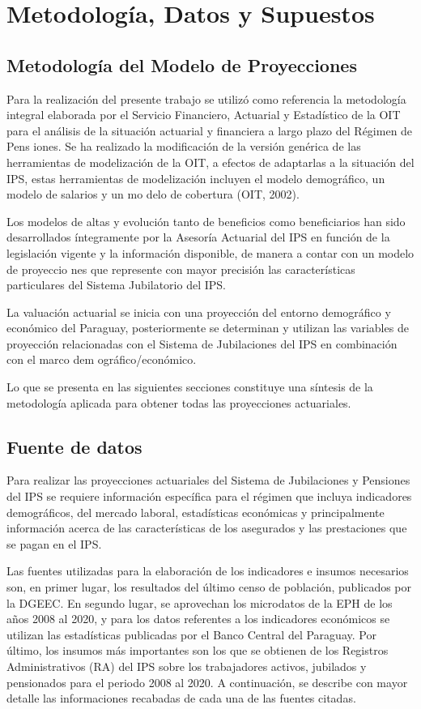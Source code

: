 \section{Metodología, Datos y Supuestos }\subsection{Metodología del Modelo de Proyecciones}

Para la realización del presente trabajo se utilizó como referencia la
metodología integral elaborada por el Servicio Financiero, Actuarial y
Estadístico de la OIT para el análisis de la situación actuarial y
financiera a largo plazo del Régimen de Pens iones. Se ha realizado la
modificación de la versión genérica de las herramientas de modelización
de la OIT, a efectos de adaptarlas a la situación del IPS, estas
herramientas de modelización incluyen el modelo demográfico, un modelo
de salarios y un mo delo de cobertura (OIT, 2002).

Los modelos de altas y evolución tanto de beneficios como beneficiarios
han sido desarrollados íntegramente por la Asesoría Actuarial del IPS en
función de la legislación vigente y la información disponible, de manera
a contar con un modelo de proyeccio nes que represente con mayor
precisión las características particulares del Sistema Jubilatorio del
IPS.

La valuación actuarial se inicia con una proyección del entorno
demográfico y económico del Paraguay, posteriormente se determinan y
utilizan las variables de proyección relacionadas con el Sistema de
Jubilaciones del IPS en combinación con el marco dem ográfico/económico.

Lo que se presenta en las siguientes secciones constituye una síntesis
de la metodología aplicada para obtener todas las proyecciones
actuariales.

\subsection{Fuente de datos}

Para realizar las proyecciones actuariales del Sistema de Jubilaciones y
Pensiones del IPS se requiere información específica para el régimen que
incluya indicadores demográficos, del mercado laboral, estadísticas
económicas y principalmente información acerca de las características de
los asegurados y las prestaciones que se pagan en el IPS.

Las fuentes utilizadas para la elaboración de los indicadores e insumos
necesarios son, en primer lugar, los resultados del último censo de
población, publicados por la DGEEC. En segundo lugar, se aprovechan los
microdatos de la EPH de los años 2008 al 2020, y para los datos
referentes a los indicadores económicos se utilizan las estadísticas
publicadas por el Banco Central del Paraguay. Por último, los insumos
más importantes son los que se obtienen de los Registros Administrativos
(RA) del IPS sobre los trabajadores activos, jubilados y pensionados
para el periodo 2008 al 2020. A continuación, se describe con mayor
detalle las informaciones recabadas de cada una de las fuentes citadas.

